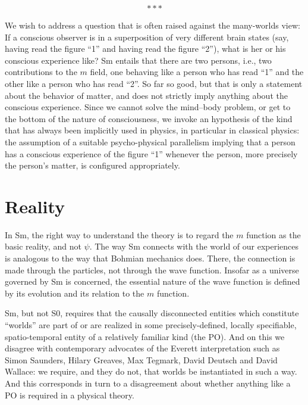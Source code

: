 \documentclass[12pt]{article}
\newcommand{\z}[1]{{#1}}
\begin{document}
\[***\]

We  \z{wish to address} a question that is often raised against the many-worlds view: If a conscious observer is in a superposition of very different brain states (say, having read the figure ``1'' and having read the figure ``2''), what is her or his conscious experience like? Sm entails that there are two persons, i.e., two contributions to the $m$ field, one behaving like a person who has read ``1'' and the other like a person who has read ``2''. So far so good, but that is only a statement about the behavior of matter, and does not strictly imply anything about the conscious experience. Since we cannot solve the mind--body problem, or get to the bottom of the nature of consciousness, we invoke an hypothesis of the kind that has always been implicitly used in physics, in particular in classical physics: the assumption of a suitable psycho-physical parallelism implying that  a person has a conscious experience  of the figure ``1'' whenever the person, more precisely the person's matter, is configured appropriately.  



\section{Reality}\label{sec:reality}

In Sm, the right way to understand the theory is to regard the $m$ function as the basic reality, and not $\psi$. 
\z{The} way Sm connects with the world of our experiences is analogous to the way that  Bohmian mechanics does. There, the connection is made through the particles, not through the wave function.
\z{Insofar as a universe governed by Sm is concerned, the essential nature of the wave function is defined by its evolution and its relation to the $m$ function.}

\z{Sm, but not S0, requires that the causally disconnected entities which constitute ``worlds'' are part of or are \z{realized} in some \z{precisely-defined}, locally specifiable, spatio-temporal entity of a relatively familiar kind (the PO). And on this we disagree with contemporary advocates of the Everett interpretation such as Simon Saunders, Hilary Greaves, Max Tegmark, David Deutsch and David Wallace: we require, and they do not, that worlds be instantiated in such a way. And this  corresponds in turn to a disagreement about whether anything like a PO is required in a physical theory. }
\end{document}
